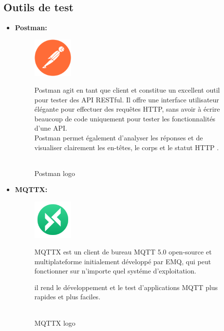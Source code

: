 \subsection{Outils de test}
\begin{itemize}

    \item \textbf{Postman: }
            \begin{figure}[!htb]\centering
            \begin{minipage}{0.30\textwidth}
            \centering
                {\includegraphics[width = 2cm , height=2cm]{img/techno/postman.png}}
                \caption{\\ Postman logo \cite{postman}}\label{Fig:Data1}
            \end{minipage}
            \begin{minipage}{0.60\textwidth}
                \par  Postman agit en tant que client et constitue un excellent outil pour tester des API RESTful. Il offre une interface utilisateur élégante pour effectuer des requêtes HTTP,
                 sans avoir à écrire beaucoup de code uniquement pour tester les fonctionnalités d'une API. \\
                 Postman permet également d'analyser les réponses et de visualiser clairement les en-têtes, le corps et le statut HTTP \cite{postman}. \\
                
            \end{minipage}
    \end{figure}
    \item\textbf{MQTTX:}
     \begin{figure}[!htb]\centering
        \begin{minipage}{0.30\textwidth}
        \centering
            {\includegraphics[width = 2cm , height=2cm]{img/techno/mqttx.png}}
            \caption{\\ MQTTX logo \cite{mqttx}}\label{Fig:Data1}
        \end{minipage}
        \begin{minipage}{0.60\textwidth}
            \par MQTTX est un client de bureau MQTT 5.0 open-source et multiplateforme initialement développé par EMQ, qui peut fonctionner sur n'importe quel systéme d'exploitation.\\
            \par il rend le développement et le test d'applications MQTT plus rapides et plus faciles\cite{mqttx}.
        \end{minipage}
    \end{figure}
    \end{itemize}
    \newpage
